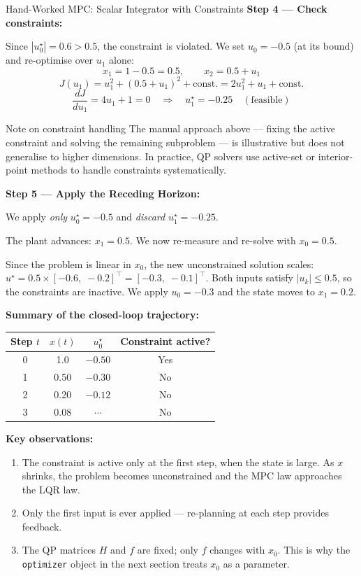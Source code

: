 \begin{examplebox}{Hand-Worked MPC: Scalar Integrator with Constraints}
\textbf{Step 4 --- Check constraints:}

Since $|u_0^\star| = 0.6 > 0.5$, the constraint is violated. We set $u_0 = -0.5$ (at its bound) and re-optimise over $u_1$ alone:
\[
x_1 = 1 - 0.5 = 0.5, \qquad x_2 = 0.5 + u_1
\]
\[
J(u_1) = u_1^2 + (0.5 + u_1)^2 + \text{const.} = 2u_1^2 + u_1 + \text{const.}
\]
\[
\frac{dJ}{du_1} = 4u_1 + 1 = 0 \quad\Longrightarrow\quad u_1^\star = -0.25 \quad (\text{feasible})
\]

\begin{notebox}{Note on constraint handling}
The manual approach above --- fixing the active constraint and solving the remaining subproblem --- is illustrative but does not generalise to higher dimensions. In practice, QP solvers use active-set or interior-point methods to handle constraints systematically.
\end{notebox}

\textbf{Step 5 --- Apply the Receding Horizon:}

We apply \emph{only} $u_0^\star = -0.5$ and \emph{discard} $u_1^\star = -0.25$.

The plant advances: $x_1 = 0.5$. We now re-measure and re-solve with $x_0 = 0.5$.

Since the problem is linear in $x_0$, the new unconstrained solution scales:
$u^\star = 0.5 \times [-0.6,\; -0.2]^\top = [-0.3,\; -0.1]^\top$. Both inputs satisfy $|u_k| \le 0.5$, so the constraints are inactive. We apply $u_0 = -0.3$ and the state moves to $x_1 = 0.2$.

\textbf{Summary of the closed-loop trajectory:}
\begin{center}
\begin{tabular}{cccc}
\toprule
Step $t$ & $x(t)$ & $u^\star_0$ & Constraint active? \\
\midrule
0 & 1.0  & $-0.50$ & Yes \\
1 & 0.50 & $-0.30$ & No \\
2 & 0.20 & $-0.12$ & No \\
3 & 0.08 & $\cdots$ & No \\
\bottomrule
\end{tabular}
\end{center}

\textbf{Key observations:}
\begin{enumerate}[noitemsep]
\item The constraint is active only at the first step, when the state is large. As $x$ shrinks, the problem becomes unconstrained and the MPC law approaches the LQR law.
\item Only the first input is ever applied --- re-planning at each step provides feedback.
\item The QP matrices $H$ and $f$ are fixed; only $f$ changes with $x_0$. This is why the \texttt{optimizer} object in the next section treats $x_0$ as a parameter.
\end{enumerate}
\end{examplebox}

